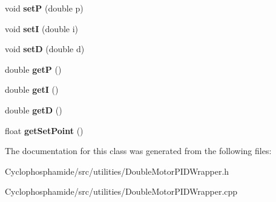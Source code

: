 \begin{DoxyCompactItemize}
\item 
\hypertarget{class_double_motor_p_i_d_wrapper_a2a2a41f113f2b2e7cec8ce3ec0e3d2ff}{}void {\bfseries set\+P} (double p)\label{class_double_motor_p_i_d_wrapper_a2a2a41f113f2b2e7cec8ce3ec0e3d2ff}

\item 
\hypertarget{class_double_motor_p_i_d_wrapper_a9ff2261a4e8b1f456f715e909dabccc7}{}void {\bfseries set\+I} (double i)\label{class_double_motor_p_i_d_wrapper_a9ff2261a4e8b1f456f715e909dabccc7}

\item 
\hypertarget{class_double_motor_p_i_d_wrapper_a5c8457df45b58b425e9eb8cabde5b4e7}{}void {\bfseries set\+D} (double d)\label{class_double_motor_p_i_d_wrapper_a5c8457df45b58b425e9eb8cabde5b4e7}

\item 
\hypertarget{class_double_motor_p_i_d_wrapper_a1d326433cb3a711b6b448128fad79f1b}{}double {\bfseries get\+P} ()\label{class_double_motor_p_i_d_wrapper_a1d326433cb3a711b6b448128fad79f1b}

\item 
\hypertarget{class_double_motor_p_i_d_wrapper_a9e765d09a527357227025fe12762cb40}{}double {\bfseries get\+I} ()\label{class_double_motor_p_i_d_wrapper_a9e765d09a527357227025fe12762cb40}

\item 
\hypertarget{class_double_motor_p_i_d_wrapper_a48777f5ffbacf7a6a1121b601d21ec43}{}double {\bfseries get\+D} ()\label{class_double_motor_p_i_d_wrapper_a48777f5ffbacf7a6a1121b601d21ec43}

\item 
\hypertarget{class_double_motor_p_i_d_wrapper_a8ded34701da8e37fe9a5e0e0a93b514a}{}float {\bfseries get\+Set\+Point} ()\label{class_double_motor_p_i_d_wrapper_a8ded34701da8e37fe9a5e0e0a93b514a}

\end{DoxyCompactItemize}


The documentation for this class was generated from the following files\+:\begin{DoxyCompactItemize}
\item 
Cyclophosphamide/src/utilities/Double\+Motor\+P\+I\+D\+Wrapper.\+h\item 
Cyclophosphamide/src/utilities/Double\+Motor\+P\+I\+D\+Wrapper.\+cpp\end{DoxyCompactItemize}
